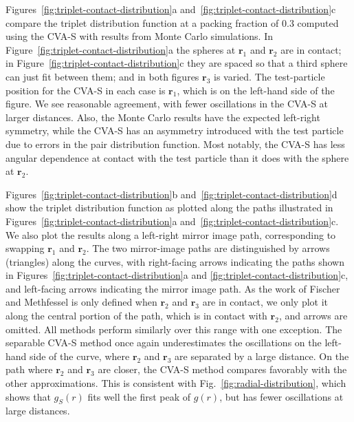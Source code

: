 \documentclass[letterpaper,twocolumn,amsmath,amssymb,pre,aps,10pt]{revtex4-1}
\newcommand{\rr}{\textbf{r}}
\begin{document}
Figures~\ref{fig:triplet-contact-distribution}a
and~\ref{fig:triplet-contact-distribution}c compare the triplet
distribution function at a packing fraction of 0.3 computed using the
CVA-S with results from Monte Carlo simulations. In
Figure~\ref{fig:triplet-contact-distribution}a the spheres at $\rr_1$
and $\rr_2$ are in contact; in
Figure~\ref{fig:triplet-contact-distribution}c they are spaced so that
a third sphere can just fit between them; and in both figures $\rr_3$
is varied. The test-particle position for the CVA-S in each case is
$\rr_1$, which is on the left-hand side of the figure. We see
reasonable agreement, with fewer oscillations in the CVA-S at larger
distances. Also, the Monte Carlo results have the expected left-right
symmetry, while the CVA-S has an asymmetry introduced with
the test particle due to errors in the pair distribution
function. Most notably, the CVA-S has less angular dependence at
contact with the test particle than it does with the sphere at
$\rr_2$.

Figures~\ref{fig:triplet-contact-distribution}b
and~\ref{fig:triplet-contact-distribution}d show the triplet
distribution function as plotted along the paths illustrated in
Figures~\ref{fig:triplet-contact-distribution}a
and~\ref{fig:triplet-contact-distribution}c.  We also plot the
results along a left-right mirror image path, corresponding to
swapping $\rr_1$ and $\rr_2$. The two mirror-image paths are
distinguished by arrows (triangles) along the curves, with right-facing arrows
indicating the paths shown in
Figures~\ref{fig:triplet-contact-distribution}a and
\ref{fig:triplet-contact-distribution}c, and left-facing arrows
indicating the mirror image path.  As the work of
Fischer and Methfessel is only defined when $\rr_2$ and $\rr_3$ are in
contact, we only plot it along the
central portion of the path, which is in contact with $\rr_2$, and arrows
are omitted.
%
All methods perform similarly over this range with one exception.  The
separable CVA-S method once again underestimates the oscillations on
the left-hand side of the curve, where $\rr_2$ and $\rr_3$ are
separated by a large distance.  On the path where $\rr_2$ and $\rr_3$
are closer, the CVA-S method compares favorably with the other
approximations.  This is consistent with
Fig.~\ref{fig:radial-distribution}, which shows that $g_S(r)$ fits
well the first peak of $g(r)$, but has fewer oscillations at large
distances.
\end{document}
